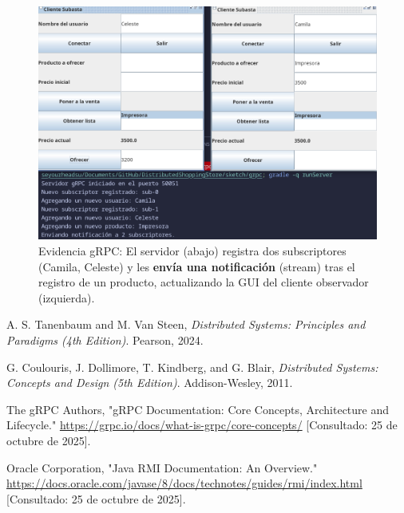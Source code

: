 \documentclass[11pt, a4paper]{article}
\begin{document}
\begin{figure}[h!]
    \centering
    \includegraphics[width=1.0\linewidth]{media/grpc-screenshots/Two-Clients+Server-Output.png}
    \caption{Evidencia gRPC: El servidor (abajo) registra dos subscriptores (Camila, Celeste) y les \textbf{envía una notificación} (stream) tras el registro de un producto, actualizando la GUI del cliente observador (izquierda).}
\end{figure}


\newpage

\begin{thebibliography}{9}

A. S. Tanenbaum and M. Van Steen,
\textit{Distributed Systems: Principles and Paradigms (4th Edition)}.
Pearson, 2024.

G. Coulouris, J. Dollimore, T. Kindberg, and G. Blair,
\textit{Distributed Systems: Concepts and Design (5th Edition)}.
Addison-Wesley, 2011.

The gRPC Authors, "gRPC Documentation: Core Concepts, Architecture and Lifecycle."
\url{https://grpc.io/docs/what-is-grpc/core-concepts/}
[Consultado: 25 de octubre de 2025].

Oracle Corporation, "Java RMI Documentation: An Overview."
\url{https://docs.oracle.com/javase/8/docs/technotes/guides/rmi/index.html}
[Consultado: 25 de octubre de 2025].

\end{thebibliography}
\end{document}
